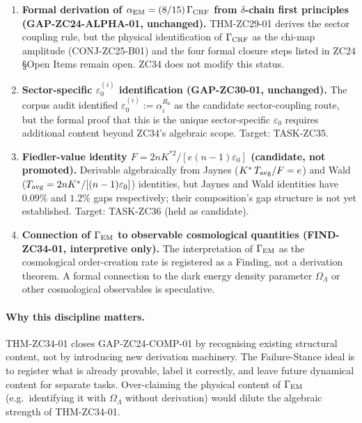 \documentclass[12pt, a4paper]{article}
\begin{document}
\begin{enumerate}[leftmargin=*, noitemsep]
  \item \textbf{Formal derivation of
    $\alpha_{\rm EM} = (8/15)\,\Gamma_{\rm CRF}$ from
    $\delta$-chain first principles (GAP-ZC24-ALPHA-01,
    unchanged).}
    THM-ZC29-01 derives the sector coupling rule, but the
    physical identification of $\Gamma_{\rm CRF}$ as the
    chi-map amplitude (CONJ-ZC25-B01) and the four formal
    closure steps listed in ZC24 \S Open Items remain open.
    ZC34 does not modify this status.

  \item \textbf{Sector-specific $\varepsilon_0^{(i)}$
    identification (GAP-ZC30-01, unchanged).}
    The corpus audit identified
    $\varepsilon_0^{(i)} := \alpha_i^{R_0}$ as the candidate
    sector-coupling route, but the formal proof that this is
    the unique sector-specific $\varepsilon_0$ requires
    additional content beyond ZC34's algebraic scope. Target:
    TASK-ZC35.

  \item \textbf{Fiedler-value identity
    $F = 2nK^{*2}/[e(n-1)\varepsilon_0]$ (candidate,
    not promoted).}
    Derivable algebraically from Jaynes ($K^*\,T_{\rm avg}/F = e$)
    and Wald ($T_{\rm avg} = 2nK^*/[(n-1)\varepsilon_0]$)
    identities, but Jaynes and Wald identities have $0.09\%$
    and $1.2\%$ gaps respectively; their composition's gap
    structure is not yet established. Target: TASK-ZC36 (held
    as candidate).

  \item \textbf{Connection of $\Gamma_{\rm EM}$ to observable
    cosmological quantities (FIND-ZC34-01, interpretive only).}
    The interpretation of $\Gamma_{\rm EM}$ as the cosmological
    order-creation rate is registered as a Finding, not a
    derivation theorem. A formal connection to the dark
    energy density parameter $\Omega_\Lambda$ or other
    cosmological observables is speculative.
\end{enumerate}

\paragraph{Why this discipline matters.}
THM-ZC34-01 closes GAP-ZC24-COMP-01 by recognising existing
structural content, not by introducing new derivation
machinery. The Failure-Stance ideal is to register what is
already provable, label it correctly, and leave future
dynamical content for separate tasks. Over-claiming the
physical content of $\Gamma_{\rm EM}$ (e.g.\ identifying it
with $\Omega_\Lambda$ without derivation) would dilute the
algebraic strength of THM-ZC34-01.
\end{document}
